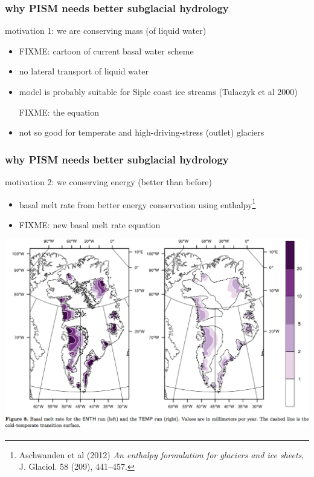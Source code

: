 \documentclass[hide notes,intlimits]{beamer}
\begin{document}
\newcommand{\whytitle}{why PISM needs better subglacial hydrology}

\begin{frame}
  \frametitle{\whytitle}
  
\begin{center}
  motivation 1: \quad we are  conserving mass (of liquid water)
\end{center}

  \begin{itemize}
    \item FIXME:  cartoon of current basal water scheme
    \item no lateral transport of liquid water
    \item model is probably suitable for Siple coast ice streams (Tulaczyk et al 2000)
    
    FIXME: the equation
    \item not so good for temperate and high-driving-stress (outlet) glaciers
  \end{itemize}
\end{frame}


\begin{frame}
  \frametitle{\whytitle}
  
\begin{center}
  motivation 2: we  conserving energy (better than before)
\end{center}
  
  \begin{itemize}
    \item basal melt rate from better energy conservation using enthalpy\footnote{\tiny Aschwanden et al (2012) \emph{An enthalpy formulation for glaciers and ice sheets}, J. Glaciol. 58 (209), 441--457.}
    \item FIXME: new basal melt rate equation
  \end{itemize}

  \begin{center}
    \includegraphics[height=0.7\textheight]{figs/enthalpy-model.png}
  \end{center}

\end{frame}
\end{document}

